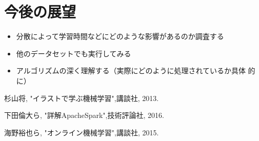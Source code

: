 \documentclass[a4paper,12pt]{jarticle}
\begin{document}
\section{今後の展望}


\begin{itemize}
 \item 分散によって学習時間などにどのような影響があるのか調査する
 \item 他のデータセットでも実行してみる
 \item アルゴリズムの深く理解する（実際にどのように処理されているか具体
	   的に） 
\end{itemize}


\begin{thebibliography}{99}

  杉山将,
		 "イラストで学ぶ機械学習",講談社, 2013.

 下田倫大ら,
		"詳解ApacheSpark",技術評論社, 2016.

  海野裕也ら,
		 "オンライン機械学習",講談社, 2015.

\end{thebibliography}
\end{document}
